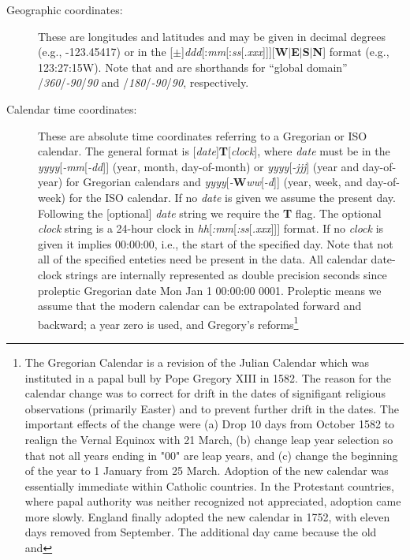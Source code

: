 \begin{description}
\item [Geographic coordinates:]  These are longitudes and latitudes and may be given in decimal degrees (e.g., -123.45417)
or in the [$\pm$]{\it ddd}[:{\it mm}[:{\it ss}[{\it .xxx}]]][{\bf W}$|${\bf E}$|${\bf S}$|${\bf N}]
format (e.g., 123:27:15W).  Note that  and  are shorthands for ``global domain'' /{\it 360}/{\it -90}/{\it 90}
and  /{\it 180}/{\it -90}/{\it 90}, respectively.
\item [Calendar time coordinates:]  These are absolute time coordinates referring to a Gregorian or ISO calendar.
The general format is [{\it date}]{\bf T}[{\it clock}], where {\it date} must be in the {\it yyyy}[{\it -mm}[{\it -dd}]] (year, month, day-of-month)
or {\it yyyy}[{\it -jjj}] (year and day-of-year) for Gregorian calendars and {\it yyyy}[{\it -}{\bf W}{\it ww}[{\it -d}]] (year, week, and
day-of-week) for the ISO calendar.  If no {\it date} is given we assume the present day.  Following the [optional] {\it date} string we require the {\bf T} flag.
The optional {\it clock} string is a 24-hour clock in {\it hh}[{\it :mm}[{\it :ss}[{\it .xxx}]]] format.  If no {\it clock} is given
it implies 00:00:00, i.e., the start of the specified day.
Note that not all of the specified enteties need be present in the data.  All calendar date-clock strings are internally represented as double precision seconds since
proleptic Gregorian date Mon Jan 1 00:00:00 0001.  Proleptic means we assume that the modern calendar
can be extrapolated forward and backward; a year zero is used, and Gregory's reforms\footnote{The Gregorian Calendar
is a revision of the Julian Calendar which was instituted in a papal bull by Pope Gregory XIII in 1582. The reason for the calendar
change was to correct for drift in the dates of signifigant religious observations (primarily Easter) and to prevent further drift
in the dates. The important effects of the change were (a) Drop 10 days from October 1582 to realign the Vernal Equinox with 21 March,
(b) change leap year selection so that not all years ending in "00" are leap years, and (c) change the beginning of the year to
1 January from 25 March.  Adoption of the new calendar was essentially immediate within Catholic countries. In the Protestant countries,
where papal authority was neither recognized not appreciated, adoption came more slowly. 
England finally adopted the new calendar in 1752, with eleven days removed from September. The additional day came because the old and
}
\end{description}
